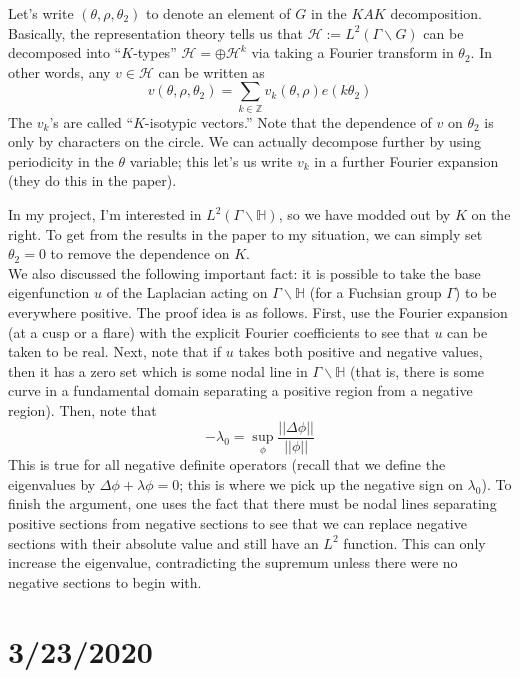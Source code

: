 \documentclass[]{article}
\begin{document}
Let's write $(\theta, \rho, \theta_2)$ to denote an element of $G$ in the $KAK$ decomposition.
Basically, the representation theory tells us that $\mathcal{H} := L^2(\Gamma\backslash G)$ can be decomposed into ``$K$-types'' $\mathcal{H} = \oplus \mathcal{H}^k$ via taking a Fourier transform in $\theta_2$.
In other words, any $v \in \mathcal{H}$ can be written as
$$
v(\theta, \rho, \theta_2) = \sum_{k \in \mathbb{Z}}v_k(\theta, \rho)e(k\theta_2)
$$
The $v_k$'s are called ``$K$-isotypic vectors.''
Note that the dependence of $v$ on $\theta_2$ is only by characters on the circle.
We can actually decompose further by using periodicity in the $\theta$ variable; this let's us write $v_k$ in a further Fourier expansion (they do this in the paper).

In my project, I'm interested in $L^2(\Gamma\backslash\mathbb{H})$, so we have modded out by $K$ on the right.
To get from the results in the paper to my situation, we can simply set $\theta_2 = 0$ to remove the dependence on $K$.
\\

We also discussed the following important fact: it is possible to take the base eigenfunction $u$ of the Laplacian acting on $\Gamma\backslash\mathbb{H}$ (for a Fuchsian group $\Gamma$) to be everywhere positive.
The proof idea is as follows.
First, use the Fourier expansion (at a cusp or a flare) with the explicit Fourier coefficients to see that $u$ can be taken to be real.
Next, note that if $u$ takes both positive and negative values, then it has a zero set which is some nodal line in $\Gamma\backslash\mathbb{H}$ (that is, there is some curve in a fundamental domain separating a positive region from a negative region).
Then, note that
$$
-\lambda_0 = \sup_{\phi}\frac{||\Delta\phi||}{||\phi||}
$$
This is true for all negative definite operators (recall that we define the eigenvalues by $\Delta \phi + \lambda \phi = 0$; this is where we pick up the negative sign on $\lambda_0$).
To finish the argument, one uses the fact that there must be nodal lines separating positive sections from negative sections to see that we can replace negative sections with their absolute value and still have an $L^2$ function.
This can only increase the eigenvalue, contradicting the supremum unless there were no negative sections to begin with.
	
\section*{3/23/2020}
\end{document}
